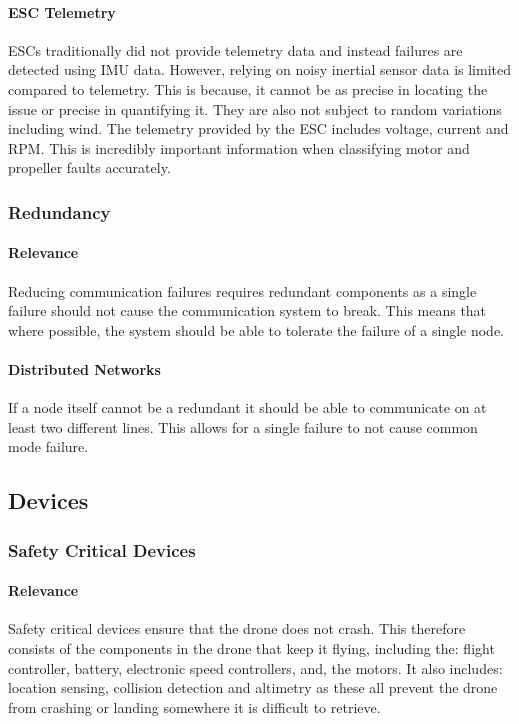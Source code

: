 \paragraph{\gls{ESC} Telemetry}
\gls{ESC}s traditionally did not provide telemetry data and instead failures are detected using \gls{IMU} data. However, relying on noisy inertial sensor data is limited compared to telemetry. This is because, it cannot be as precise in locating the issue or precise in quantifying it. They are also not subject to random variations including wind. The telemetry provided by the \gls{ESC} includes voltage, current and \gls{RPM}. This is incredibly important information when classifying motor and propeller faults accurately.  

\subsubsection{Redundancy}
\paragraph{Relevance}
Reducing communication failures requires redundant components as a single failure should not cause the communication system to break. This means that where possible, the system should be able to tolerate the failure of a single node.
\paragraph{Distributed Networks}
If a node itself cannot be a redundant it should be able to communicate on at least two different lines. This allows for a single failure to not cause common mode failure.

\subsection{Devices}
\subsubsection{Safety Critical Devices}
\paragraph{Relevance}
Safety critical devices ensure that the drone does not crash. This therefore consists of the components in the drone that keep it flying, including the: flight controller, battery, electronic speed controllers, and, the motors. It also includes: location sensing,  collision detection and altimetry as these all prevent the drone from crashing or landing somewhere it is difficult to retrieve.
